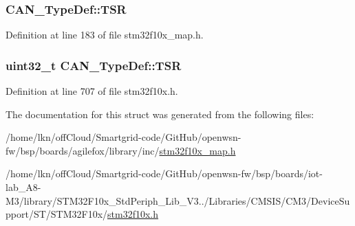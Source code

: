 \subsubsection[{\texorpdfstring{T\+SR}{TSR}}]{ C\+A\+N\+\_\+\+Type\+Def\+::\+T\+SR}\hypertarget{struct_c_a_n___type_def_a83f042976a2c6d2d4ad342958009ace1}{}\label{struct_c_a_n___type_def_a83f042976a2c6d2d4ad342958009ace1}


Definition at line 183 of file stm32f10x\+\_\+map.\+h.

\subsubsection[{\texorpdfstring{T\+SR}{TSR}}]{ {\bf uint32\+\_\+t} C\+A\+N\+\_\+\+Type\+Def\+::\+T\+SR}\hypertarget{struct_c_a_n___type_def_acbc82ac4e87e75350fc586be5e56d95b}{}\label{struct_c_a_n___type_def_acbc82ac4e87e75350fc586be5e56d95b}


Definition at line 707 of file stm32f10x.\+h.



The documentation for this struct was generated from the following files\+:\begin{DoxyCompactItemize}
\item 
/home/lkn/off\+Cloud/\+Smartgrid-\/code/\+Git\+Hub/openwsn-\/fw/bsp/boards/agilefox/library/inc/\hyperlink{agilefox_2library_2inc_2stm32f10x__map_8h}{stm32f10x\+\_\+map.\+h}\item 
/home/lkn/off\+Cloud/\+Smartgrid-\/code/\+Git\+Hub/openwsn-\/fw/bsp/boards/iot-\/lab\+\_\+\+A8-\/\+M3/library/\+S\+T\+M32\+F10x\+\_\+\+Std\+Periph\+\_\+\+Lib\+\_\+\+V3../\+Libraries/\+C\+M\+S\+I\+S/\+C\+M3/\+Device\+Support/\+S\+T/\+S\+T\+M32\+F10x/\hyperlink{iot-lab___a8-_m3_2library_2_s_t_m32_f10x___std_periph___lib___v3_85_80_2_libraries_2_c_m_s_i_s_26497265545392eb5694b064ae15018db}{stm32f10x.\+h}\end{DoxyCompactItemize}
